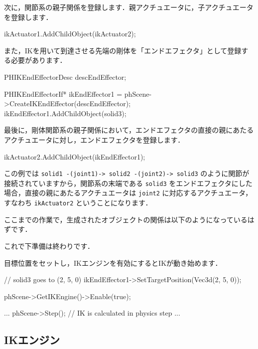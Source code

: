 \KLUDGE 次に，関節系の親子関係を登録します．親アクチュエータに，子アクチュエータを登録します．
\begin{sourcecode}
ikActuator1.AddChildObject(ikActuator2);
\end{sourcecode}


\KLUDGE また，IKを用いて到達させる先端の剛体を「エンドエフェクタ」として登録する必要があります．
\begin{sourcecode}
PHIKEndEffectorDesc descEndEffector;

PHIKEndEffectorIf* ikEndEffector1
  = phScene->CreateIKEndEffector(descEndEffector);
ikEndEffector1.AddChildObject(solid3);
\end{sourcecode}


\KLUDGE 最後に，剛体関節系の親子関係において，エンドエフェクタの直接の親にあたるアクチュエータに対し，エンドエフェクタを登録します．
\begin{sourcecode}
ikActuator2.AddChildObject(ikEndEffector1);
\end{sourcecode}
\KLUDGE この例では \texttt{solid1 -(joint1)-> solid2 -(joint2)-> solid3} のように関節が接続されていますから，関節系の末端である \texttt{solid3} をエンドエフェクタにした場合，直接の親にあたるアクチュエータは \texttt{joint2} に対応するアクチュエータ，すなわち \texttt{ikActuator2} ということになります．

\KLUDGE ここまでの作業で，生成されたオブジェクトの関係は以下のようになっているはずです．
\begin{center}
\end{center}
\KLUDGE これで下準備は終わりです．

\KLUDGE 目標位置をセットし，IKエンジンを有効にするとIKが動き始めます．
\begin{sourcecode}
// solid3 goes to (2, 5, 0)
ikEndEffector1->SetTargetPosition(Vec3d(2, 5, 0)); 

phScene->GetIKEngine()->Enable(true);

...
phScene->Step(); // IK is calculated in physics step
...
\end{sourcecode}

\KLUDGE %
\KLUDGE %
\KLUDGE %
\KLUDGE %

\KLUDGE %
\subsection*{IKエンジン}
\KLUDGE %

